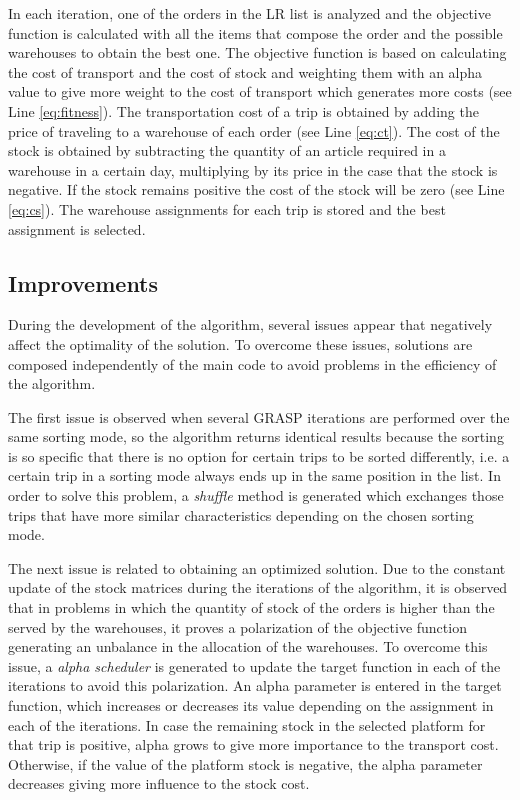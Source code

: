 \documentclass[letterpaper]{article} %
\begin{document}
In each iteration, one of the orders in the LR list is analyzed and the objective function is calculated with all the items that compose the order and the possible warehouses to obtain the best one. The objective function is based on calculating the cost of transport and the cost of stock and weighting them with an alpha value to give more weight to the cost of transport which generates more costs (see Line \ref{eq:fitness}).
The transportation cost of a trip is obtained by adding the price of traveling to a warehouse of each order (see Line \ref{eq:ct}). The cost of the stock is obtained by subtracting the quantity of an article required in a warehouse in a certain day, multiplying by its price in the case that the stock is negative. If the stock remains positive the cost of the stock will be zero (see Line \ref{eq:cs}). The warehouse assignments for each trip is stored and the best assignment is selected.

\subsection*{Improvements}
During the development of the algorithm, several issues appear that negatively affect the optimality of the solution. To overcome these issues, solutions are composed independently of the main code to avoid problems in the efficiency of the algorithm.

The first issue is observed when several GRASP iterations are performed over the same sorting mode, so the algorithm returns identical results because the sorting is so specific that there is no option for certain trips to be sorted differently, i.e. a certain trip in a sorting mode always ends up in the same position in the list. In order to solve this problem, a \textit{shuffle} method is generated which exchanges those trips that have more similar characteristics depending on the chosen sorting mode.

The next issue is related to obtaining an optimized solution. Due to the constant update of the stock matrices during the iterations of the algorithm, it is observed that in problems in which the quantity of stock of the orders is higher than the served by the warehouses, it proves a polarization of the objective function generating an unbalance in the allocation of the warehouses. To overcome this issue, a \textit{alpha scheduler} is generated to update the target function in each of the iterations to avoid this polarization. An alpha parameter is entered in the target function, which increases or decreases its value depending on the assignment in each of the iterations. In case the remaining stock in the selected platform for that trip is positive, alpha grows to give more importance to the transport cost. Otherwise, if the value of the platform stock is negative, the alpha parameter decreases giving more influence to the stock cost.
\end{document}
